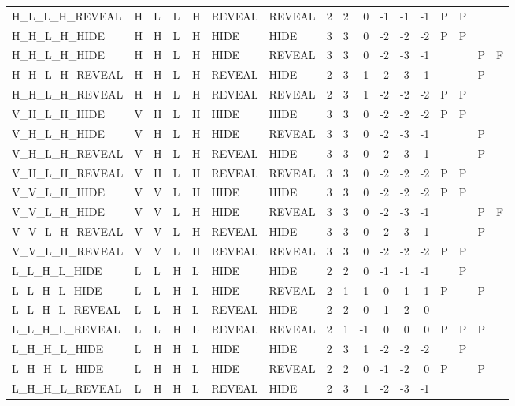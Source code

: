 \begin{longtable}{lllllllrrrrrrllll}
  H\_L\_L\_H\_REVEAL & H & L & L & H & REVEAL & REVEAL & 2 & 2 & 0 & -1 & -1 & -1 & P & P &  &  \\ 
  H\_H\_L\_H\_HIDE & H & H & L & H & HIDE & HIDE & 3 & 3 & 0 & -2 & -2 & -2 & P & P &  &  \\ 
  H\_H\_L\_H\_HIDE & H & H & L & H & HIDE & REVEAL & 3 & 3 & 0 & -2 & -3 & -1 &  &  & P & F \\ 
  H\_H\_L\_H\_REVEAL & H & H & L & H & REVEAL & HIDE & 2 & 3 & 1 & -2 & -3 & -1 &  &  & P &  \\ 
  H\_H\_L\_H\_REVEAL & H & H & L & H & REVEAL & REVEAL & 2 & 3 & 1 & -2 & -2 & -2 & P & P &  &  \\ 
  V\_H\_L\_H\_HIDE & V & H & L & H & HIDE & HIDE & 3 & 3 & 0 & -2 & -2 & -2 & P & P &  &  \\ 
  V\_H\_L\_H\_HIDE & V & H & L & H & HIDE & REVEAL & 3 & 3 & 0 & -2 & -3 & -1 &  &  & P &  \\ 
  V\_H\_L\_H\_REVEAL & V & H & L & H & REVEAL & HIDE & 3 & 3 & 0 & -2 & -3 & -1 &  &  & P &  \\ 
  V\_H\_L\_H\_REVEAL & V & H & L & H & REVEAL & REVEAL & 3 & 3 & 0 & -2 & -2 & -2 & P & P &  &  \\ 
  V\_V\_L\_H\_HIDE & V & V & L & H & HIDE & HIDE & 3 & 3 & 0 & -2 & -2 & -2 & P & P &  &  \\ 
  V\_V\_L\_H\_HIDE & V & V & L & H & HIDE & REVEAL & 3 & 3 & 0 & -2 & -3 & -1 &  &  & P & F \\ 
  V\_V\_L\_H\_REVEAL & V & V & L & H & REVEAL & HIDE & 3 & 3 & 0 & -2 & -3 & -1 &  &  & P &  \\ 
  V\_V\_L\_H\_REVEAL & V & V & L & H & REVEAL & REVEAL & 3 & 3 & 0 & -2 & -2 & -2 & P & P &  &  \\ 
  L\_L\_H\_L\_HIDE & L & L & H & L & HIDE & HIDE & 2 & 2 & 0 & -1 & -1 & -1 &  & P &  &  \\ 
  L\_L\_H\_L\_HIDE & L & L & H & L & HIDE & REVEAL & 2 & 1 & -1 & 0 & -1 & 1 & P &  & P &  \\ 
  L\_L\_H\_L\_REVEAL & L & L & H & L & REVEAL & HIDE & 2 & 2 & 0 & -1 & -2 & 0 &  &  &  &  \\ 
  L\_L\_H\_L\_REVEAL & L & L & H & L & REVEAL & REVEAL & 2 & 1 & -1 & 0 & 0 & 0 & P & P & P &  \\ 
  L\_H\_H\_L\_HIDE & L & H & H & L & HIDE & HIDE & 2 & 3 & 1 & -2 & -2 & -2 &  & P &  &  \\ 
  L\_H\_H\_L\_HIDE & L & H & H & L & HIDE & REVEAL & 2 & 2 & 0 & -1 & -2 & 0 & P &  & P &  \\ 
  L\_H\_H\_L\_REVEAL & L & H & H & L & REVEAL & HIDE & 2 & 3 & 1 & -2 & -3 & -1 &  &  &  &  \\ 

\end{longtable}
